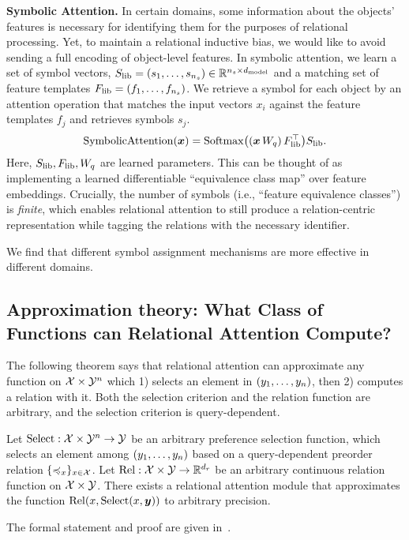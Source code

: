 \textbf{Symbolic Attention.} In certain domains, some information about the objects' features is necessary for identifying them for the purposes of relational processing. Yet, to maintain a relational inductive bias, we would like to avoid sending a full encoding of object-level features. In symbolic attention, we learn a set of symbol vectors, $S_\mathrm{lib} = (s_1, \ldots, s_{n_s}) \in \mathbb{R}^{n_s \times d_{\mathrm{model}}}$ and a matching set of feature templates $F_\mathrm{lib} = (f_1, \ldots, f_{n_s})$. We retrieve a symbol for each object by an attention operation that matches the input vectors $x_i$ against the feature templates $f_j$ and retrieves symbols $s_j$.
\begin{equation}
  \mathrm{SymbolicAttention}(\bm{x}) = \mathrm{Softmax}\big((\bm{x} \, W_q)\, F_\mathrm{lib}^\top\big) S_\mathrm{lib}.
\end{equation}
Here, $S_\mathrm{lib}, F_\mathrm{lib}, W_q$ are learned parameters. This can be thought of as implementing a learned differentiable ``equivalence class map'' over feature embeddings. Crucially, the number of symbols (i.e., ``feature equivalence classes'') is \textit{finite}, which enables relational attention to still produce a relation-centric representation while tagging the relations with the necessary identifier.

We find that different symbol assignment mechanisms are more effective in different domains.

\subsection{Approximation theory: What Class of Functions can Relational Attention Compute?}

The following theorem says that relational attention can approximate any function on ${\mathcal{X}} \times {\mathcal{Y}}^n$ which 1) selects an element in $(y_1, \ldots, y_n)$, then 2) computes a relation with it. Both the selection criterion and the relation function are arbitrary, and the selection criterion is query-dependent.
\begin{theorem}[Informal]
  Let $\mathrm{Select}: {\mathcal{X}} \times {\mathcal{Y}}^n \to {\mathcal{Y}}$ be an arbitrary preference selection function, which selects an element among $(y_1, \ldots, y_n)$ based on a query-dependent preorder relation $\{\preccurlyeq_x\}_{x \in {\mathcal{X}}}$. Let $\mathrm{Rel}: {\mathcal{X}} \times {\mathcal{Y}} \to \mathbb{R}^{d_r}$ be an arbitrary continuous relation function on ${\mathcal{X}} \times {\mathcal{Y}}$. There exists a relational attention module that approximates the function $\mathrm{Rel}(x, \mathrm{Select}(x, \bm{y}))$ to arbitrary precision.
\end{theorem}
The formal statement and proof are given in~.